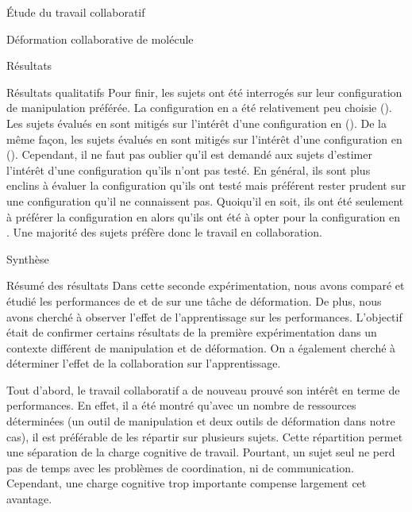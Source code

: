 \documentclass[myfrancais]{mythesis}
\begin{document}
\begin{mypart}{Étude du travail collaboratif}
\begin{mychapter}{Déformation collaborative de molécule}
\begin{mysection}{Résultats}
\begin{mysubsection}{Résultats qualitatifs}
					Pour finir, les sujets ont été interrogés sur leur configuration de manipulation préférée.
					La configuration  en  a été relativement peu choisie ().
					Les sujets évalués en  sont mitigés sur l'intérêt d'une configuration  en  ().
					De la même façon, les sujets évalués en  sont mitigés sur l'intérêt d'une configuration  en  ().
					Cependant, il ne faut pas oublier qu'il est demandé aux sujets d'estimer l'intérêt d'une configuration qu'ils n'ont pas testé.
					En général, ils sont plus enclins à évaluer la configuration qu'ils ont testé mais préférent rester prudent sur une configuration qu'il ne connaissent pas.
					Quoiqu'il en soit, ils ont été seulement  à préférer la configuration  en  alors qu'ils ont été  à opter pour la configuration  en .
					Une majorité des sujets préfère donc le travail en collaboration.
				\end{mysubsection}
			\end{mysection}
			\begin{mysection}{Synthèse}
				\begin{mysubsection}{Résumé des résultats}
					Dans cette seconde expérimentation, nous avons comparé et étudié les performances de  et de  sur une tâche de déformation.
					De plus, nous avons cherché à observer l'effet de l'apprentissage sur les performances.
					L'objectif était de confirmer certains résultats de la première expérimentation dans un contexte différent de manipulation et de déformation.
					On a également cherché à déterminer l'effet de la collaboration sur l'apprentissage.

					Tout d'abord, le travail collaboratif a de nouveau prouvé son intérêt en terme de performances.
					En effet, il a été montré qu'avec un nombre de ressources déterminées (un outil de manipulation et deux outils de déformation dans notre cas), il est préférable de les répartir sur plusieurs sujets.
					Cette répartition permet une séparation de la charge cognitive de travail.
					Pourtant, un sujet seul ne perd pas de temps avec les problèmes de coordination, ni de communication.
					Cependant, une charge cognitive trop importante compense largement cet avantage.


\end{mysubsection}
\end{mysection}
\end{mychapter}
\end{mypart}
\end{document}
